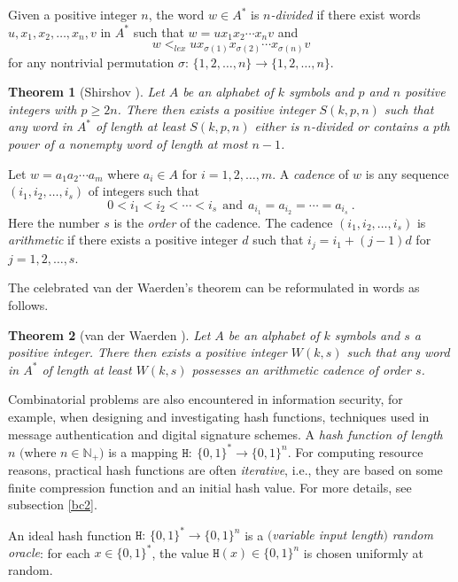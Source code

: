 \documentclass[submission,copyright,creativecommons]{eptcs}
\newcommand{\N}{\mathbb N}
\newcommand{\h}{\mathtt H}
\newtheorem{theorem}{Theorem}
\begin{document}
Given a positive integer $n$, the word $w\in A^\ast$ is \textit{$n$-divided} if there exist words $u,x_1,x_2,\ldots, x_n,v$ in $A^\ast$ such that $w=ux_1x_2\cdots x_nv$ and 
\[
w<_{lex} ux_{\sigma(1)}x_{\sigma(2)}\cdots x_{\sigma(n)}v
\]
for any nontrivial permutation $\sigma:\,\{1,2,\ldots,n\}\rightarrow \{1,2,\ldots,n\}$. 

\begin{theorem}[Shirshov \cite{Lot,dLV,RR1}] Let $A$ be an alphabet of $k$ symbols and $p$ and $n$ positive integers with $p\ge 2n$. There then  exists a positive integer $S(k,p,n)$ such that any word in $A^\ast$ of length at least $S(k,p,n)$ either is $n$-divided or contains a $p$th power of a nonempty word of length at most $n-1$.
\end{theorem}

Let $w=a_1a_2\cdots a_m$ where $a_i\in A$ for $i=1,2,\ldots,m$. A \textit{cadence} of $w$ is any sequence $(i_1,i_2,\ldots,i_s)$ of integers such that
\[
0<i_1<i_2<\cdots <i_s\ \ \textrm{and}\ \ a_{i_1}=a_{i_2}=\cdots =a_{i_s}\ .
\]
Here the number $s$ is the \textit{order} of the cadence. The cadence $(i_1,i_2,\ldots,i_s)$ is \textit{arithmetic} if there exists a positive integer $d$ such that $i_j=i_1+(j-1)d$ for $j=1,2,\ldots,s$.

The celebrated van der Waerden's theorem can be reformulated in words as follows.

\begin{theorem}[van der Waerden \cite{Lot,dLV}] Let $A$ be an alphabet of $k$ symbols and $s$ a positive integer. There then exists a positive integer $W(k,s)$ such that any word in $A^\ast$ of length at least $W(k,s)$ possesses an arithmetic cadence of order $s$.
\end{theorem}

Combinatorial problems are also encountered in information security, for example, when designing and investigating hash functions, techniques used in message authentication and digital signature schemes. A \textit{hash function of length $n$} $($where $n\in\N_+$$)$ is a mapping $\h:\ \{0,1\}^\ast\rightarrow \{0,1\}^n$. For computing resource reasons, practical hash functions are often \textit{iterative}, i.e., they are based on some finite compression function and an initial hash value. For more details, see subsection \ref{bc2}.

An ideal hash function $\h:\, \{0,1\}^\ast\rightarrow \{0,1\}^n$ is a \textit{$($variable input length$)$ random oracle}: for
each $x\in \{0,1\}^\ast$, the value $\h(x)\in \{0,1\}^n$ is chosen uniformly at random. 
\end{document}
